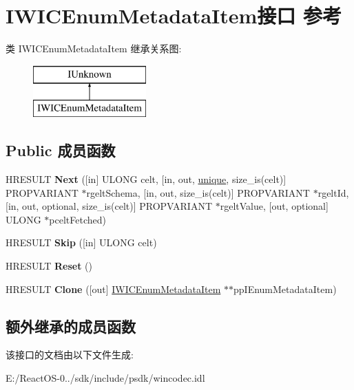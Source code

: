 \hypertarget{interface_i_w_i_c_enum_metadata_item}{}\section{I\+W\+I\+C\+Enum\+Metadata\+Item接口 参考}
\label{interface_i_w_i_c_enum_metadata_item}
类 I\+W\+I\+C\+Enum\+Metadata\+Item 继承关系图\+:\begin{figure}[H]
\begin{center}
\leavevmode
\includegraphics[height=2.000000cm]{interface_i_w_i_c_enum_metadata_item}
\end{center}
\end{figure}
\subsection*{Public 成员函数}
\begin{DoxyCompactItemize}
\item 
\mbox{\label{interface_i_w_i_c_enum_metadata_item_aae66375aedbc4d6c0944c520d4942491}} 
H\+R\+E\+S\+U\+LT {\bfseries Next} (\mbox{[}in\mbox{]} U\+L\+O\+NG celt, \mbox{[}in, out, \hyperlink{interfaceunique}{unique}, size\+\_\+is(celt)\mbox{]} P\+R\+O\+P\+V\+A\+R\+I\+A\+NT $\ast$rgelt\+Schema, \mbox{[}in, out, size\+\_\+is(celt)\mbox{]} P\+R\+O\+P\+V\+A\+R\+I\+A\+NT $\ast$rgelt\+Id, \mbox{[}in, out, optional, size\+\_\+is(celt)\mbox{]} P\+R\+O\+P\+V\+A\+R\+I\+A\+NT $\ast$rgelt\+Value, \mbox{[}out, optional\mbox{]} U\+L\+O\+NG $\ast$pcelt\+Fetched)
\item 
\mbox{\label{interface_i_w_i_c_enum_metadata_item_af773a0d2f701c76ac0dd60b172a83950}} 
H\+R\+E\+S\+U\+LT {\bfseries Skip} (\mbox{[}in\mbox{]} U\+L\+O\+NG celt)
\item 
\mbox{\label{interface_i_w_i_c_enum_metadata_item_a1e511f0802145701442328af88af244f}} 
H\+R\+E\+S\+U\+LT {\bfseries Reset} ()
\item 
\mbox{\label{interface_i_w_i_c_enum_metadata_item_af7a8662705298a2ca8f775ca30518ec1}} 
H\+R\+E\+S\+U\+LT {\bfseries Clone} (\mbox{[}out\mbox{]} \hyperlink{interface_i_w_i_c_enum_metadata_item}{I\+W\+I\+C\+Enum\+Metadata\+Item} $\ast$$\ast$pp\+I\+Enum\+Metadata\+Item)
\end{DoxyCompactItemize}
\subsection*{额外继承的成员函数}


该接口的文档由以下文件生成\+:\begin{DoxyCompactItemize}
\item 
E\+:/\+React\+O\+S-\/0../sdk/include/psdk/wincodec.\+idl\end{DoxyCompactItemize}
